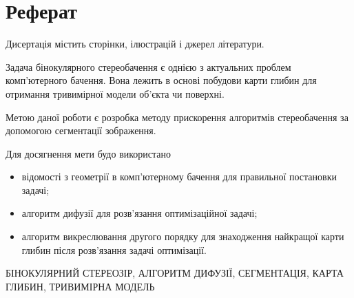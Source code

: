 \chapter*{Реферат}

Дисертація містить \pageref{LastPage} сторінки,
 ілюстрацій і
 джерел літератури.

Задача бінокулярного стереобачення є
однією з актуальних проблем комп'ютерного бачення.
Вона лежить в основі побудови карти глибин
для отримання тривимірної модели об'єкта чи поверхні.

Метою даної роботи є розробка методу прискорення алгоритмів стереобачення
за допомогою сегментації зображення.

Для досягнення мети будо використано
\begin{itemize}
  \item відомості з геометрії в комп'ютерному бачення
        для правильної постановки задачі;
  \item алгоритм дифузії для розв'язання оптимізаційної задачі;
  \item алгоритм викреслювання другого порядку для знаходження
        найкращої карти глибин після розв'язання задачі оптимізації.
\end{itemize}

\MakeUppercase{бінокулярний стереозір,
               алгоритм дифузії,
               сегментація,
               карта глибин,
               тривимірна модель}
